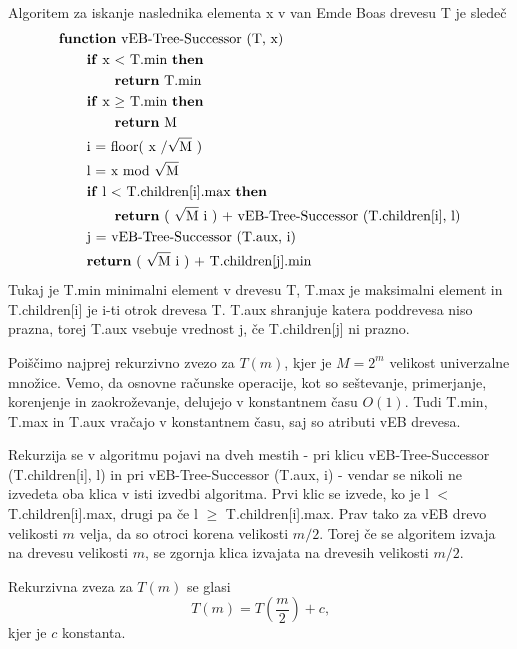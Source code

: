 \documentclass{article}
\begin{document}
Algoritem za iskanje naslednika elementa x v van Emde Boas drevesu T je sledeč
\begin{align*}
    &\text{\textbf{function} vEB-Tree-Successor (T, x)} \\
    &\qquad \text{\textbf{if} x $<$ T.min \textbf{then}} \\
    &\qquad \qquad \text{\textbf{return} T.min} \\
    &\qquad \text{\textbf{if} x $\geq$ T.min \textbf{then}} \\
    &\qquad \qquad \text{\textbf{return} M} \\
    &\qquad \text{i  $=$ floor( x $ / \sqrt{\text{M}}$ )} \\
    &\qquad \text{l $=$ x mod $\sqrt{\text{M}}$} \\
    &\qquad \text{\textbf{if} l $<$ T.children[i].max \textbf{then}} \\
    &\qquad \qquad \text{\textbf{return} ( $\sqrt{\text{M}}$ i ) + vEB-Tree-Successor (T.children[i], l)} \\
    &\qquad \text{j = vEB-Tree-Successor (T.aux, i)} \\
    &\qquad \text{\textbf{return} ( $\sqrt{\text{M}}$ i ) + T.children[j].min}
\end{align*}
Tukaj je T.min minimalni element v drevesu T, T.max je maksimalni element in T.children[i] je i-ti otrok drevesa T. 
T.aux shranjuje katera poddrevesa niso prazna, torej T.aux vsebuje vrednost j, če T.children[j] ni prazno.

Poiščimo najprej rekurzivno zvezo za $T(m)$, kjer je $M = 2^m$ velikost univerzalne množice.
Vemo, da osnovne računske operacije, kot so seštevanje, primerjanje, korenjenje in zaokroževanje, delujejo v  konstantnem času $O(1)$.
Tudi T.min, T.max in T.aux vračajo v konstantnem času, saj so atributi vEB drevesa. 

Rekurzija se v algoritmu pojavi na dveh mestih - pri klicu vEB-Tree-Successor (T.children[i], l) in pri vEB-Tree-Successor (T.aux, i) - vendar se nikoli ne izvedeta oba klica v isti izvedbi algoritma.
Prvi klic se izvede, ko je l $<$ T.children[i].max, drugi pa če l $\geq$ T.children[i].max.
Prav tako za vEB drevo velikosti $m$ velja, da so otroci korena velikosti $m/2$. 
Torej če se algoritem izvaja na drevesu velikosti $m$, se zgornja klica izvajata na drevesih velikosti $m/2$.

Rekurzivna zveza za $T(m)$ se glasi
$$ T(m) = T(\frac{m}{2}) + c \text{,}$$
kjer je $c$ konstanta.
\end{document}

